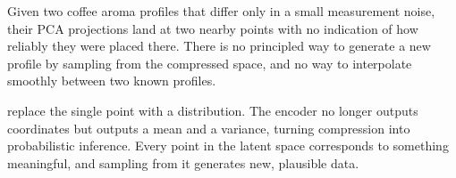 Given two coffee aroma profiles that differ only in a small measurement noise, their PCA projections land at two nearby points with no indication of how reliably they were placed there.
There is no principled way to generate a new profile by sampling from the compressed space, and no way to interpolate smoothly between two known profiles.

 replace the single point with a distribution.
The encoder no longer outputs coordinates but outputs a mean and a variance, turning compression into probabilistic inference.
Every point in the latent space corresponds to something meaningful, and sampling from it generates new, plausible data.
